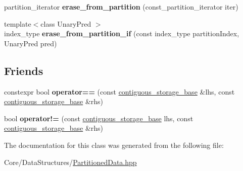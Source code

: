 \begin{DoxyCompactItemize}
\item 
\mbox{\label{classsequoia_1_1data__structures_1_1contiguous__storage__base_a20f7bc244b6652cacbeded3d5dfd405b}} 
partition\+\_\+iterator {\bfseries erase\+\_\+from\+\_\+partition} (const\+\_\+partition\+\_\+iterator iter)
\item 
\mbox{\label{classsequoia_1_1data__structures_1_1contiguous__storage__base_af45eb63a7411e9ae4870ac6f6b84b706}} 
{\footnotesize template$<$class Unary\+Pred $>$ }\\index\+\_\+type {\bfseries erase\+\_\+from\+\_\+partition\+\_\+if} (const index\+\_\+type partition\+Index, Unary\+Pred pred)
\end{DoxyCompactItemize}
\subsection*{Friends}
\begin{DoxyCompactItemize}
\item 
\mbox{\label{classsequoia_1_1data__structures_1_1contiguous__storage__base_abe2a5b00debcc6592c1a4b140f5f01c9}} 
constexpr bool {\bfseries operator==} (const \mbox{\hyperlink{classsequoia_1_1data__structures_1_1contiguous__storage__base}{contiguous\+\_\+storage\+\_\+base}} \&lhs, const \mbox{\hyperlink{classsequoia_1_1data__structures_1_1contiguous__storage__base}{contiguous\+\_\+storage\+\_\+base}} \&rhs)
\item 
\mbox{\label{classsequoia_1_1data__structures_1_1contiguous__storage__base_a5d51cc3695ab7c1dd86428fa7cb934a0}} 
bool {\bfseries operator!=} (const \mbox{\hyperlink{classsequoia_1_1data__structures_1_1contiguous__storage__base}{contiguous\+\_\+storage\+\_\+base}} lhs, const \mbox{\hyperlink{classsequoia_1_1data__structures_1_1contiguous__storage__base}{contiguous\+\_\+storage\+\_\+base}} \&rhs)
\end{DoxyCompactItemize}


The documentation for this class was generated from the following file\+:\begin{DoxyCompactItemize}
\item 
Core/\+Data\+Structures/\mbox{\hyperlink{_partitioned_data_8hpp}{Partitioned\+Data.\+hpp}}\end{DoxyCompactItemize}
